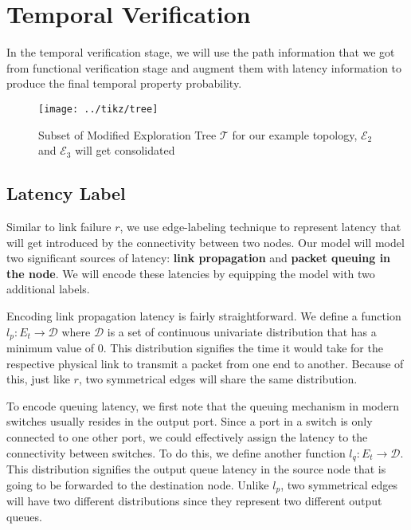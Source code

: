 \section{Temporal Verification}
In the temporal verification stage, we will use the path information that we got from 
functional verification stage and augment them with latency information to 
produce the final temporal property probability.

\begin{figure}[h]
    \centering
    \texttt{[image: ../tikz/tree]}
    \caption{Subset of Modified Exploration Tree $\mathcal{T}$ for our example topology, 
        $\mathcal{E}_2$ and $\mathcal{E}_3$ will get consolidated}
    \label{fig:tree}
\end{figure}

\subsection{Latency Label}
Similar to link failure $r$, we use edge-labeling technique to represent latency that 
will get introduced by the connectivity between two nodes. 
Our model will model two significant sources of latency: \textbf{link propagation} 
and \textbf{packet queuing in the node}.
We will encode these latencies by equipping the model with two additional labels.

Encoding link propagation latency is fairly straightforward. 
We define a function $l_p: E_t \rightarrow \mathcal{D}$ where $\mathcal{D}$ is a set of 
continuous univariate distribution that has a minimum value of $0$.
This distribution signifies the time it would take for the respective physical link to transmit 
a packet from one end to another.
Because of this, just like $r$, two symmetrical edges will share the same distribution.

To encode queuing latency, we first note that the queuing mechanism in modern switches 
usually resides in the output port. %
Since a port in a switch is only connected to one other port, we could effectively 
assign the latency to the connectivity between switches.
To do this, we define another function $l_q: E_t \rightarrow \mathcal{D}$.
This distribution signifies the output queue latency in the source node that is 
going to be forwarded to the destination node.
Unlike $l_p$, two symmetrical edges will have two different distributions since they 
represent two different output queues.

